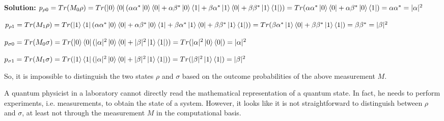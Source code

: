 \documentclass[12pt]{article}
\begin{document}
\begin{enumerate}
          \textbf{Solution:}
          $p_{\rho0}=Tr(M_0\rho)=Tr(\ket{0}\bra{0}(\alpha\alpha^*\ket{0}\bra{0}+
              \alpha\beta^*\ket{0}\bra{1}+\beta\alpha^*\ket{1}\bra{0}+\beta\beta^*\ket{1}\bra{1}))=Tr(\alpha\alpha^*\ket{0}\bra{0}+\alpha\beta^*\ket{0}\bra{1})=\alpha\alpha^*=|\alpha|^2$

          $p_{\rho1} = Tr(M_1\rho) = Tr(\ket{1}\bra{1}(\alpha\alpha^*\ket{0}\bra{0}+
              \alpha\beta^*\ket{0}\bra{1}+\beta\alpha^*\ket{1}\bra{0}+\beta\beta^*\ket{1}\bra{1})) = Tr(\beta\alpha^*\ket{1}\bra{0}+\beta\beta^*\ket{1}\bra{1}) = \beta\beta^* = |\beta|^2$

          $p_{\sigma0} = Tr(M_0\sigma) = Tr(\ket{0}\bra{0}(|\alpha|^2\ket{0}\bra{0}+|\beta|^2\ket{1}\bra{1})) = Tr(|\alpha|^2\ket{0}\bra{0}) = |\alpha|^2$

          $p_{\sigma1} = Tr(M_1\sigma) = Tr(\ket{1}\bra{1}(|\alpha|^2\ket{0}\bra{0}+|\beta|^2\ket{1}\bra{1})) = Tr(|\beta|^2\ket{1}\bra{1}) = |\beta|^2$

          So, it is impossible to distinguish the two states $\rho$ and $\sigma$ based on the outcome probabilities of the above measurement $M$.

          \vspace{\dimexpr\itemsep+\baselineskip}
\end{enumerate}

A quantum physicist in a laboratory cannot directly read the mathematical representation of a quantum state. In fact, he needs to perform experiments, i.e. measurements, to obtain the state of a system. However, it looks like it is not straightforward to distinguish between $\rho$ and $\sigma$, at least not through the measurement $M$ in the computational basis.
\end{document}
